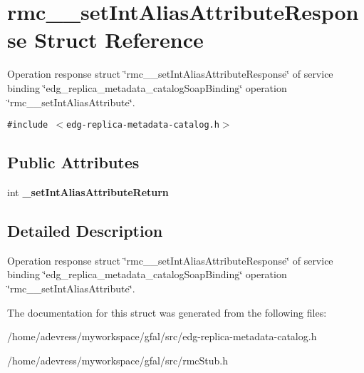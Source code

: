 \section{rmc\_\-\_\-set\-Int\-Alias\-Attribute\-Response Struct Reference}
\label{structrmc____setIntAliasAttributeResponse}
Operation response struct \char`\"{}rmc\_\-\_\-set\-Int\-Alias\-Attribute\-Response\char`\"{} of service binding \char`\"{}edg\_\-replica\_\-metadata\_\-catalog\-Soap\-Binding\char`\"{} operation \char`\"{}rmc\_\-\_\-set\-Int\-Alias\-Attribute\char`\"{}.  


{\tt \#include $<$edg-replica-metadata-catalog.h$>$}

\subsection*{Public Attributes}
\begin{CompactItemize}
\item 
int \textbf{\_\-set\-Int\-Alias\-Attribute\-Return}\label{structrmc____setIntAliasAttributeResponse_15f5523f79562c84c4639e8d05cb36cb}

\end{CompactItemize}


\subsection{Detailed Description}
Operation response struct \char`\"{}rmc\_\-\_\-set\-Int\-Alias\-Attribute\-Response\char`\"{} of service binding \char`\"{}edg\_\-replica\_\-metadata\_\-catalog\-Soap\-Binding\char`\"{} operation \char`\"{}rmc\_\-\_\-set\-Int\-Alias\-Attribute\char`\"{}. 



The documentation for this struct was generated from the following files:\begin{CompactItemize}
\item 
/home/adevress/myworkspace/gfal/src/edg-replica-metadata-catalog.h\item 
/home/adevress/myworkspace/gfal/src/rmc\-Stub.h\end{CompactItemize}
